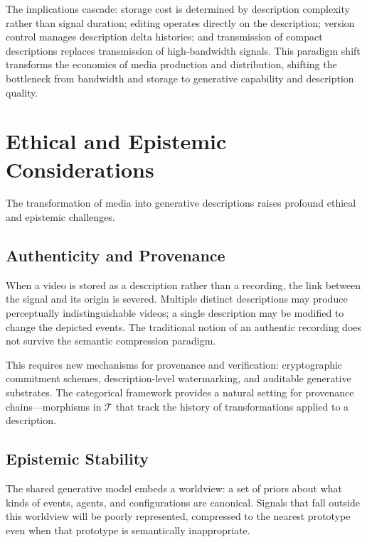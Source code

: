 \documentclass[11pt,a4paper]{article}
\theoremstyle{definition}
\theoremstyle{remark}
\begin{document}
The implications cascade: storage cost is determined by description complexity rather than signal duration; editing operates directly on the description; version control manages description delta histories; and transmission of compact descriptions replaces transmission of high-bandwidth signals. This paradigm shift transforms the economics of media production and distribution, shifting the bottleneck from bandwidth and storage to generative capability and description quality.

\section{Ethical and Epistemic Considerations}
\label{sec:ethics}

The transformation of media into generative descriptions raises profound ethical and epistemic challenges.

\subsection{Authenticity and Provenance}

When a video is stored as a description rather than a recording, the link between the signal and its origin is severed. Multiple distinct descriptions may produce perceptually indistinguishable videos; a single description may be modified to change the depicted events. The traditional notion of an authentic recording does not survive the semantic compression paradigm.

This requires new mechanisms for provenance and verification: cryptographic commitment schemes, description-level watermarking, and auditable generative substrates. The categorical framework provides a natural setting for provenance chains---morphisms in $\mathcal{T}$ that track the history of transformations applied to a description.

\subsection{Epistemic Stability}

The shared generative model embeds a worldview: a set of priors about what kinds of events, agents, and configurations are canonical. Signals that fall outside this worldview will be poorly represented, compressed to the nearest prototype even when that prototype is semantically inappropriate.
\end{document}
